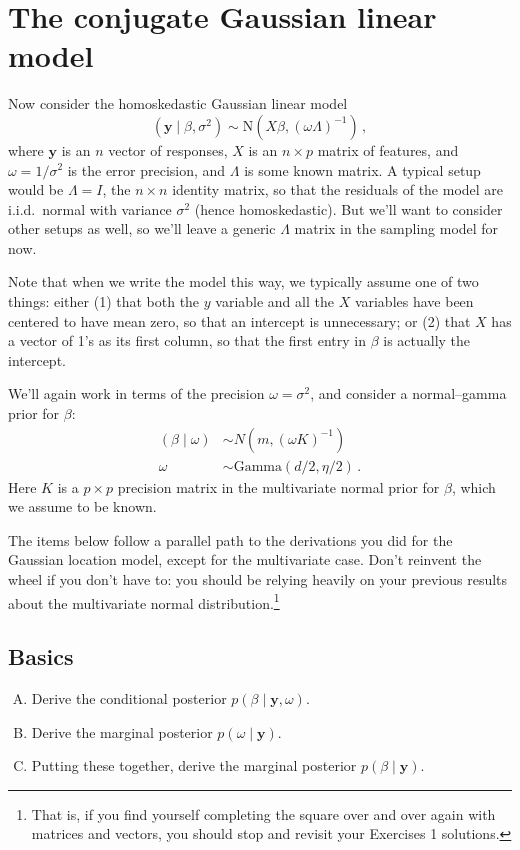 \documentclass[11pt]{article}
\newcommand{\by}{\textbf{y}}
\newcommand{\N}{\mbox{N}}
\begin{document}
\newpage 

\section{The conjugate Gaussian linear model}

Now consider the homoskedastic Gaussian linear model
$$
(\by \mid \beta, \sigma^2) \sim \N(X\beta, (\omega \Lambda)^{-1} ) \, ,
$$
where $\by$ is an $n$ vector of responses, $X$ is an $n \times p$ matrix of features, and $\omega = 1/\sigma^2$ is the error precision, and $\Lambda$ is some known matrix.  A typical setup would be $\Lambda = I$, the $n \times n$ identity matrix, so that the residuals of the model are i.i.d.~normal with variance $\sigma^2$ (hence homoskedastic).  But we'll want to consider other setups as well, so we'll leave a generic $\Lambda$ matrix in the sampling model for now.

Note that when we write the model this way, we typically assume one of two things: either (1) that both the $y$ variable and all the $X$ variables have been centered to have mean zero, so that an intercept is unnecessary; or (2) that $X$ has a vector of 1's as its first column, so that the first entry in $\beta$ is actually the intercept.

We'll again work in terms of the precision $\omega = \sigma^2$, and consider a normal--gamma prior for $\beta$:
\begin{align}
(\beta \mid \omega) &\sim N(m, (\omega K)^{-1}) \\
\omega &\sim \mbox{Gamma}(d/2, \eta/2) \, .
\end{align}
Here $K$ is a $p \times p$ precision matrix in the multivariate normal prior for $\beta$, which we assume to be known.

The items below follow a parallel path to the derivations you did for the Gaussian location model, except for the multivariate case.  Don't reinvent the wheel if you don't have to: you should be relying heavily on your previous results about the multivariate normal distribution.\footnote{That is, if you find yourself completing the square over and over again with matrices and vectors, you should stop and revisit your Exercises 1 solutions.}

\subsection{Basics}

\begin{enumerate}[(A)]

\item Derive the conditional posterior $p(\beta \mid \by, \omega)$.

\item Derive the marginal posterior $p(\omega \mid \by)$.

\item Putting these together, derive the marginal posterior $p(\beta \mid \by)$.

\end{enumerate}
\end{document}
